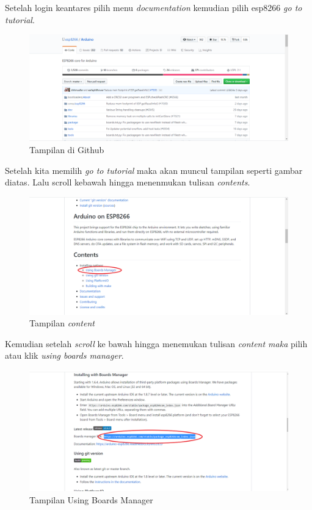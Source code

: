 \begin{enumerate}
     \par Setelah login keantares pilih menu \textit{documentation} kemudian  pilih esp8266 \textit{go to tutorial}.
      \begin{figure}[H]
    \centering
    \includegraphics[width=1\textwidth]{figures/antares20.png}
    \caption{Tampilan di Github}
    \label{print}
    \end{figure}
    \par Setelah kita memilih \textit{go to tutorial} maka akan muncul tampilan seperti gambar diatas. Lalu scroll kebawah hingga menenmukan tulisan \textit{contents}.
     \begin{figure}[H]
    \centering
    \includegraphics[width=1\textwidth]{figures/antares18.png}
    \caption{Tampilan \textit{content}}
    \label{print}
    \end{figure}
    
    \par Kemudian setelah \textit{scroll} ke bawah hingga menemukan tulisan \textit{content maka} pilih atau klik \textit{using boards manager}.
     \begin{figure}[H]
    \centering
    \includegraphics[width=1\textwidth]{figures/antares19.png}
    \caption{Tampilan Using Boards Manager}
    \label{print}
    \end{figure}
    

\end{enumerate}
